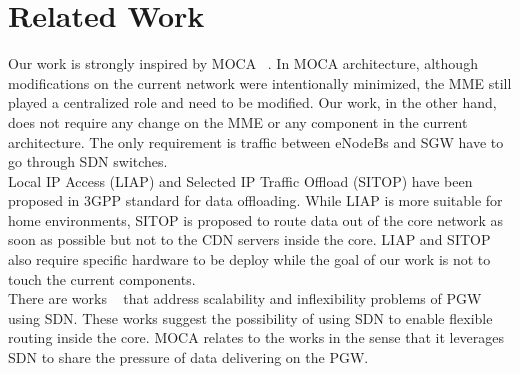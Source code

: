\section{Related Work}

Our work is strongly inspired by MOCA ~\cite{banerjee2013moca}. In MOCA architecture, although modifications on the current network were intentionally minimized, the MME still played a centralized role and need to be modified. Our work, in the other hand, does not require any change on the MME or any component in the current architecture. The only requirement is traffic between eNodeBs and SGW have to go through SDN switches.\\

Local IP Access (LIAP) and Selected IP Traffic Offload (SITOP) have been proposed in 3GPP standard for data offloading. While LIAP is more suitable for home environments, SITOP is proposed to route data out of the core network as soon as possible but not to the CDN servers inside the core. LIAP and SITOP also require specific hardware to be deploy while the goal of our work is not to touch the current components.\\

There are works ~\cite{jin2013softcell, li2012toward} that address scalability and inflexibility problems of PGW using SDN. These works suggest the possibility of using SDN to enable flexible routing inside the core. MOCA relates to the works in the sense that it leverages SDN to share the pressure of data delivering on the PGW.\\





